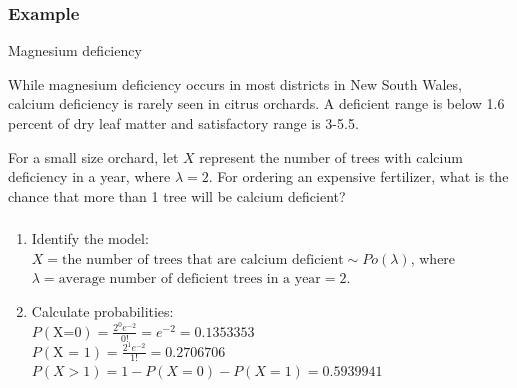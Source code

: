 \documentclass[t,xcolor=pdftex,dvipsnames,table]{beamer}\usepackage[]{graphicx}\usepackage[]{color}
\begin{document}
\begin{frame}\frametitle{Example}
\begin{block}{Magnesium deficiency}

While magnesium deficiency occurs in most districts in New South Wales, calcium deficiency is rarely seen in citrus orchards. A deficient range is below 1.6 percent of dry leaf matter and satisfactory range is 3-5.5.

\vspace{.5cm}
For a small size orchard, let $X$ represent the number of trees with calcium deficiency in a year, where $\lambda=2$.  
For ordering an expensive fertilizer, what is the chance that more than 1 tree will be calcium deficient? 
\href{http://www.dpi.nsw.gov.au/agriculture/horticulture/citrus/management/nutrition/nutrition}{}
\end{block}
\end{frame}

\begin{frame}\frametitle{}


\begin{block}{}
\begin{enumerate}
\item Identify the model: \\
$X = \mbox{the number of trees that are calcium deficient} \sim Po(\lambda)$, where 
$\lambda= \mbox{average number of deficient trees in a year} = 2$.
\item  
Calculate probabilities: \\
$P(\mbox{X=0}) = \frac{ 2^0 e^{-2}}{0!} =e^{-2} = 0.1353353$ \\
$P(\mbox{X = 1}) =  \frac{ 2^1 e^{-2}}{1!} = 0.2706706$ \\
$P(X > 1) = 1- P(X=0) - P(X=1) = 0.5939941$
\end{enumerate}
\end{block}
\end{frame}
\end{document}
